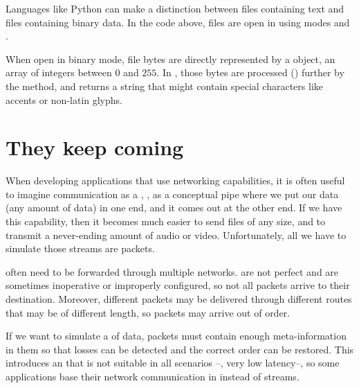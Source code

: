 \begin{center}
\end{center}

\begin{remark}
Languages like Python can make a distinction between files containing text and files containing binary data.
In the code above, files are open in  using modes  and .

When open in binary mode, file bytes are directly represented by a  object, an array of 
integers between $0$ and $255$. In , those bytes are processed () further by the  method,
and returns a string that might contain special characters like accents or non-latin glyphs. 
\end{remark}

\section{They keep coming}\label{sec:packets:stream}

When developing applications that use networking capabilities, it is often useful 
to imagine communication as a , \ie, as a conceptual pipe where we put 
our data (any amount of data) in one end, and it comes out at the other end. If we have
this capability, then it becomes much easier to send files of any size, and to transmit a never-ending
amount of audio or video. Unfortunately, all we have to simulate those streams are packets.

 often need to be forwarded through multiple networks.  are not perfect
and are sometimes inoperative or improperly configured, so not all packets arrive to their destination. Moreover,
different packets may be delivered through different routes that may be of different length, so packets may arrive
out of order.

If we want to simulate a  of data, packets must contain enough meta-information in them so that losses can be detected and 
the correct order can be restored. This introduces an  that is not suitable in all scenarios --\eg, very low latency--,
so some applications base their network communication in  instead of streams.

